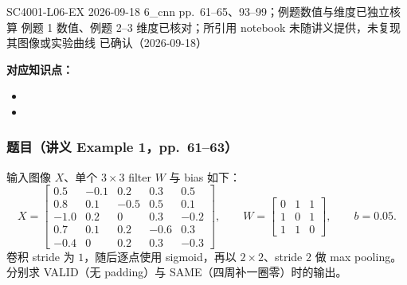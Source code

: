 

\examplemeta
  {SC4001-L06-EX}
  {2026-09-18}
  {6\_cnn pp.~61--65、93--99；例题数值与维度已独立核算}
  {例题 1 数值、例题 2--3 维度已核对；所引用 notebook 未随讲义提供，未复现其图像或实验曲线}
  {已确认（2026-09-18）}


\textbf{对应知识点：}
\begin{itemize}
  \item {}
  \item {}
\end{itemize}

\subsubsection*{题目（讲义 Example 1，pp.~61--63）}

输入图像 $X$、单个 $3\times3$ filter $W$ 与 bias 如下：
\[
X=\begin{bmatrix}
0.5&-0.1&0.2&0.3&0.5\\
0.8&0.1&-0.5&0.5&0.1\\
-1.0&0.2&0&0.3&-0.2\\
0.7&0.1&0.2&-0.6&0.3\\
-0.4&0&0.2&0.3&-0.3
\end{bmatrix},\qquad
W=\begin{bmatrix}0&1&1\\1&0&1\\1&1&0\end{bmatrix},\qquad b=0.05.
\]
卷积 stride 为 $1$，随后逐点使用 sigmoid，再以 $2\times2$、stride $2$ 做 max pooling。分别求 VALID（无 padding）与 SAME（四周补一圈零）时的输出。

